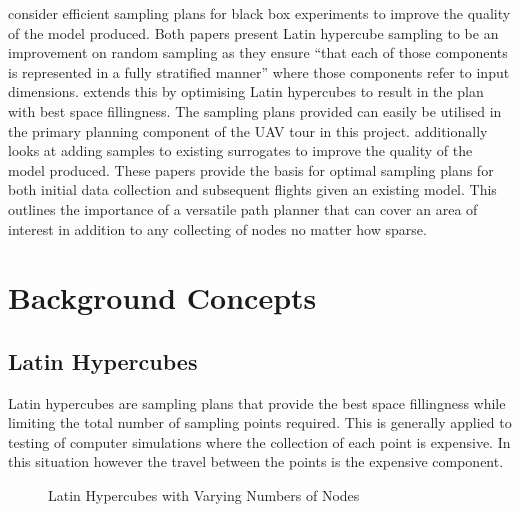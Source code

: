 \documentclass[a4paper,12pt,twoside]{article}
\begin{document}
 consider efficient sampling plans for black box experiments to improve the quality of the model produced. Both papers present Latin hypercube sampling to be an improvement on random sampling as they ensure ``that each of those components is represented in a fully stratified manner'' \cite{McKay2000} where those components refer to input dimensions.  extends this by optimising Latin hypercubes to result in the plan with best space fillingness. The sampling plans provided can easily be utilised in the primary planning component of the UAV tour in this project.  additionally looks at adding samples to existing surrogates to improve the quality of the model produced. These papers provide the basis for optimal sampling plans for both initial data collection and subsequent flights given an existing model. This outlines the importance of a versatile path planner that can cover an area of interest in addition to any collecting of nodes no matter how sparse.

\section{Background Concepts}
\label{sec:background_concepts}

\subsection{Latin Hypercubes}
\label{sec:latin_hypercubes}

Latin hypercubes are sampling plans that provide the best space fillingness while limiting the total number of sampling points required. This is generally applied to testing of computer simulations where the collection of each point is expensive. In this situation however the travel between the points is the expensive component.

\begin{figure}
	\centering
	
	\caption{Latin Hypercubes with Varying Numbers of Nodes}
	\label{fig:latin_hypercubes_with_varying_numbers_of_nodes}
\end{figure}
\end{document}
